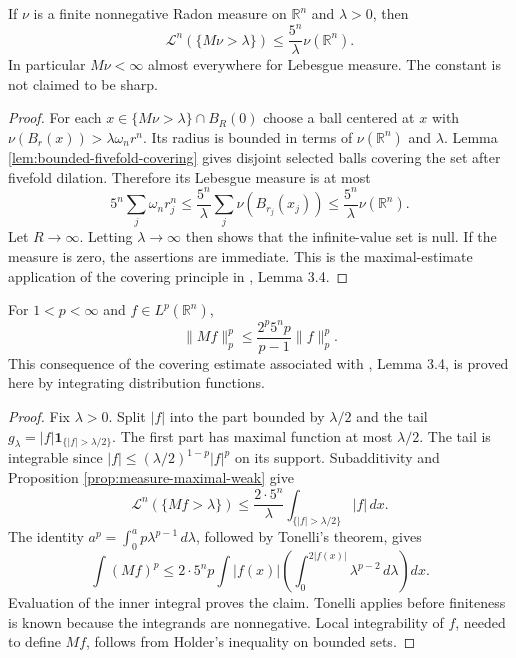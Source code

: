 \begin{proposition}\label{prop:measure-maximal-weak}
If $\nu$ is a finite nonnegative Radon measure on $\mathbb R^n$ and $\lambda>0$, then
\[
 \mathcal L^n(\{M\nu>\lambda\})\leq\frac{5^n}{\lambda}\nu(\mathbb R^n).
\]
In particular $M\nu<\infty$ almost everywhere for Lebesgue measure. The constant is not claimed to be sharp.
\end{proposition}
\begin{proof}
For each $x\in\{M\nu>\lambda\}\cap B_R(0)$ choose a ball centered at $x$ with $\nu(B_r(x))>\lambda\omega_n r^n$. Its radius is bounded in terms of $\nu(\mathbb R^n)$ and $\lambda$. Lemma \ref{lem:bounded-fivefold-covering} gives disjoint selected balls covering the set after fivefold dilation. Therefore its Lebesgue measure is at most
\[
 5^n\sum_j\omega_n r_j^n
 \leq\frac{5^n}{\lambda}\sum_j\nu(B_{r_j}(x_j))
 \leq\frac{5^n}{\lambda}\nu(\mathbb R^n).
\]
Let $R\to\infty$. Letting $\lambda\to\infty$ then shows that the infinite-value set is null. If the measure is zero, the assertions are immediate. This is the maximal-estimate application of the covering principle in \cite{Sim18}, Lemma 3.4.
\end{proof}

\begin{theorem}\label{thm:maximal-strong-lp}
For $1<p<\infty$ and $f\in L^p(\mathbb R^n)$,
\[
 \|Mf\|_p^p\leq\frac{2^p5^n p}{p-1}\|f\|_p^p.
\]
This consequence of the covering estimate associated with \cite{Sim18}, Lemma 3.4, is proved here by integrating distribution functions.
\end{theorem}
\begin{proof}
Fix $\lambda>0$. Split $|f|$ into the part bounded by $\lambda/2$ and the tail $g_\lambda=|f|\mathbf1_{\{|f|>\lambda/2\}}$. The first part has maximal function at most $\lambda/2$. The tail is integrable since $|f|\leq(\lambda/2)^{1-p}|f|^p$ on its support. Subadditivity and Proposition \ref{prop:measure-maximal-weak} give
\[
 \mathcal L^n(\{Mf>\lambda\})
 \leq\frac{2\cdot5^n}{\lambda}\int_{\{|f|>\lambda/2\}}|f|\,dx.
\]
The identity $a^p=\int_0^a p\lambda^{p-1}\,d\lambda$, followed by Tonelli's theorem, gives
\[
 \int(Mf)^p\leq2\cdot5^n p\int |f(x)|
       \left(\int_0^{2|f(x)|}\lambda^{p-2}\,d\lambda\right)dx.
\]
Evaluation of the inner integral proves the claim. Tonelli applies before finiteness is known because the integrands are nonnegative. Local integrability of $f$, needed to define $Mf$, follows from Holder's inequality on bounded sets.
\end{proof}

